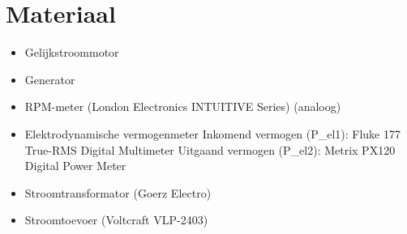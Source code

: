 \section{Materiaal}
\begin{itemize}
    \item Gelijkstroommotor
    \item Generator
    \item RPM-meter (London Electronics INTUITIVE Series) (analoog)
    \item Elektrodynamische vermogenmeter
        Inkomend vermogen (P_{el1}): Fluke 177 True-RMS Digital Multimeter
        Uitgaand vermogen (P_{el2}): Metrix PX120 Digital Power Meter
    \item Stroomtransformator (Goerz Electro)
    \item Stroomtoevoer (Voltcraft VLP-2403)
\end{itemize}
